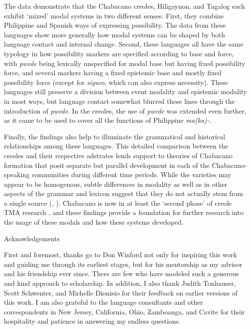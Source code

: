 \documentclass[output=paper]{langsci/langscibook}
\begin{document}
The data demonstrate that the Chabacano creoles, Hiligaynon, and Tagalog each exhibit ‘mixed’ modal systems in two different senses. First, they combine Philippine and Spanish ways of expressing possibility. The data from these languages show more generally how modal systems can be shaped by both language contact and internal change. Second, these languages all have the same typology in how possibility markers are specified according to base and force, with \textit{pwede} being lexically unspecified for modal base but having fixed possibility force, and several markers having a fixed epistemic base and mostly fixed possibility force (except for \textit{siguro}, which can also express necessity). These languages still preserve a division between event modality and epistemic modality in most ways, but language contact somewhat blurred these lines through the introduction of \textit{pwede}. In the creoles, the use of \textit{pwede} was extended even further, as it came to be used to cover all the functions of Philippine \textit{ma(ka)-}.

Finally, the findings also help to illuminate the grammatical and historical relationships among these languages. This detailed comparison between the creoles and their respective adstrates lends support to theories of Chabacano formation that posit separate but parallel development in each of the Chabacano-speaking communities during different time periods. While the varieties may appear to be homogenous, subtle differences in modality as well as in other aspects of the grammar and lexicon suggest that they do not actually stem from a single source (\citealt{LeshoSippola2014}, \citealt{SippolaLesho2020}). Chabacano is now in at least the ‘second phase’ of creole TMA research \citep{Winford2018}, and these findings provide a foundation for further research into the usage of these modals and how these systems developed.

\begin{stylelsUnNumberedSection}
Acknowledgements
\end{stylelsUnNumberedSection}

First and foremost, thanks go to Don Winford not only for inspiring this work and guiding me through its earliest stages, but for his mentorship as my advisor and his friendship ever since. There are few who have modeled such a generous and kind approach to scholarship. In addition, I also thank Judith Tonhauser, Scott Schwenter, and Michelle Dionisio for their feedback on earlier versions of this work. I am also grateful to the language consultants and other correspondents in New Jersey, California, Ohio, Zamboanga, and Cavite for their hospitality and patience in answering my endless questions. 
\end{document}
